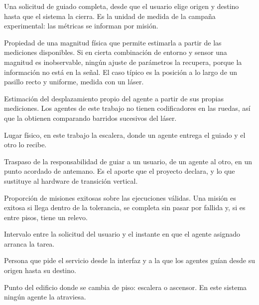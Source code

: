 \begin{description}[style=nextline,leftmargin=1.5em,itemsep=0.2em]
  \item[Misión] Una solicitud de guiado completa, desde que el usuario elige
    origen y destino hasta que el sistema la cierra. Es la unidad de medida de
    la campaña experimental: las métricas se informan por misión.

  \item[Observabilidad] Propiedad de una magnitud física que permite estimarla a
    partir de las mediciones disponibles. Si en cierta combinación de entorno y
    sensor una magnitud es inobservable, ningún ajuste de parámetros la
    recupera, porque la información no está en la señal. El caso típico es la posición a lo largo de un pasillo recto y uniforme, medida con un láser.

  \item[Odometría] Estimación del desplazamiento propio del agente a partir de sus propias mediciones. Los agentes de este trabajo no tienen codificadores en las ruedas, así que la obtienen comparando barridos sucesivos del láser.

  \item[Punto de transferencia] Lugar físico, en este trabajo la escalera, donde
    un agente entrega el guiado y el otro lo recibe.

  \item[Relevo] Traspaso de la responsabilidad de guiar a un usuario, de un
    agente al otro, en un punto acordado de antemano. Es el aporte que el
    proyecto declara, y lo que sustituye al hardware de transición vertical.

  \item[Tasa de éxito] Proporción de misiones exitosas sobre las ejecuciones válidas. Una misión es exitosa si llega dentro de la tolerancia, se completa sin pasar por fallida y, si es entre pisos, tiene un relevo.

  \item[Tiempo de respuesta] Intervalo entre la solicitud del usuario y el
    instante en que el agente asignado arranca la tarea.

  \item[Usuario] Persona que pide el servicio desde la interfaz y a la que los agentes
    guían desde su origen hasta su destino.

  \item[Zona de transición] Punto del edificio donde se cambia de piso:
    escalera o ascensor. En este sistema ningún agente la atraviesa.
\end{description}

